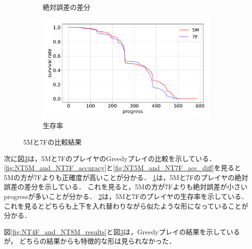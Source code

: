 \begin{figure}[t]
\begin{subfigure}[b]{0.49\linewidth}
    \caption{絶対誤差の差分}
    \label{fig:NT5M_and_NT7F_error_abs_diff}
\end{subfigure}
\begin{subfigure}[b]{0.49\linewidth}
    \includegraphics[width=\linewidth]{pdf/compare/NT5M_and_NT7F/survival.pdf}
    \caption{生存率}
    \label{fig:NT5M_and_NT7F_survival}
\end{subfigure}
\caption{5Mと7Fの比較結果}
\label{fig:NT5M_and_NT7F_results}
\end{figure}

次に図\ref{fig:NT5M_and_NT7F_results}は，5Mと7FのプレイヤのGreedyプレイの比較を示している．
\ref{fig:NT5M_and_NT7F_accuracy}と\ref{fig:NT5M_and_NT7F_acc_diff}を見ると
5Mの方が7Fよりも正確度が高いことが分かる．
\ref{fig:NT5M_and_NT7F_error_abs_diff}は，5Mと7Fのプレイヤの絶対誤差の差分を示している．
これを見ると，5Mの方が7Fよりも絶対誤差が小さいprogressが多いことが分かる．
\ref{fig:NT5M_and_NT7F_survival}は，5Mと7Fのプレイヤの生存率を示している．
これを見るとどちらも上下を入れ替わりながら似たような形になっていることが分かる．

図\ref{fig:NT4F_and_NT8M_results}と図\ref{fig:NT5M_and_NT7F_results}は，Greedyプレイの結果を示しているが，
どちらの結果からも特徴的な形は見られなかった．
    
